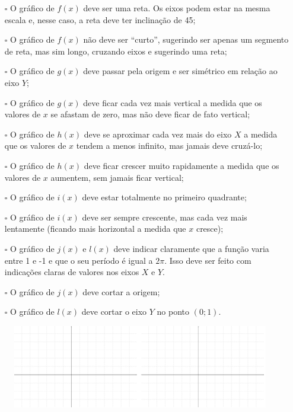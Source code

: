 \documentclass[main_estudante.tex]{subfiles}
\begin{document}
\begin{itemize}
 \item[$\square$] O gráfico de $f(x)$ deve ser uma reta. Os eixos podem estar na mesma escala e, nesse caso, a reta deve ter inclinação de 45\degree;
 \item[$\square$] O gráfico de $f(x)$ não deve ser ``curto'', sugerindo ser apenas um segmento de reta, mas sim longo, cruzando eixos e sugerindo uma reta;
 \item[$\square$] O gráfico de $g(x)$ deve passar pela origem e ser simétrico em relação ao eixo $Y$;
 \item[$\square$] O gráfico de $g(x)$ deve ficar cada vez mais vertical a medida que os valores de $x$ se afastam de zero, mas não deve ficar de fato vertical;
 \item[$\square$] O gráfico de $h(x)$ deve se aproximar cada vez mais do eixo $X$ a medida que os valores de $x$ tendem a menos infinito, mas jamais deve cruzá-lo;
 \item[$\square$] O gráfico de $h(x)$ deve ficar crescer muito rapidamente a medida que os valores de $x$ aumentem, sem jamais ficar vertical;
 \item[$\square$] O gráfico de $i(x)$ deve estar totalmente no primeiro quadrante;
 \item[$\square$] O gráfico de $i(x)$ deve ser sempre crescente, mas cada vez mais lentamente (ficando mais horizontal a medida que $x$ cresce);
 \item[$\square$] O gráfico de $j(x)$ e $l(x)$ deve indicar claramente que a função varia entre 1 e -1 e que o seu período é igual a $2\pi$. Isso deve ser feito com indicações claras de valores nos eixos $X$ e $Y$.
 \item[$\square$] O gráfico de $j(x)$ deve cortar a origem;
 \item[$\square$] O gráfico de $l(x)$ deve cortar o eixo $Y$ no ponto $(0;1)$.
\end{itemize}

\newpage

\begin{figure}[h]
\centering
\includegraphics[width=\textwidth]{./img/c7q1.png}
\end{figure}
\end{document}
